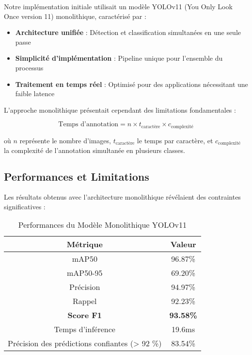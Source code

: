 \documentclass[letterpaper, 10 pt, conference]{ieeeconf}  %
\begin{document}
Notre implémentation initiale utilisait un modèle YOLOv11
(You Only Look Once version 11) monolithique, caractérisé par :

\begin{itemize}
\item \textbf{Architecture unifiée} : Détection et classification simultanées en une seule passe
\item \textbf{Simplicité d'implémentation} : Pipeline unique pour l'ensemble du processus
\item \textbf{Traitement en temps réel} : Optimisé pour des applications nécessitant une faible latence
\end{itemize}

L'approche monolithique présentait cependant des limitations fondamentales :

\begin{equation}
\text{Temps d'annotation} = n \times t_{\text{caractère}} \times c_{\text{complexité}}
\end{equation}

où $n$ représente le nombre d'images, $t_{\text{caractère}}$
le temps par caractère, et $c_{\text{complexité}}$ la complexité
de l'annotation simultanée en plusieurs classes.

\subsection{Performances et Limitations}

Les résultats obtenus avec l'architecture monolithique révélaient des contraintes significatives :

\begin{table}[h]
\caption{Performances du Modèle Monolithique YOLOv11}
\label{table_monolithique}
\begin{center}
\begin{tabular}{|c|c|}
\hline
\textbf{Métrique} & \textbf{Valeur} \\
\hline
mAP50 & 96.87\% \\
\hline
mAP50-95 & 69.20\% \\
\hline
Précision & 94.97\% \\
\hline
Rappel & 92.23\% \\
\hline
\textbf{Score F1} & \textbf{93.58\%} \\
\hline
Temps d'inférence & 19.6ms \\
\hline
Précision des prédictions confiantes (> 92 \%) & 83.54\% \\
\hline
\end{tabular}
\end{center}
\end{table}
\end{document}
